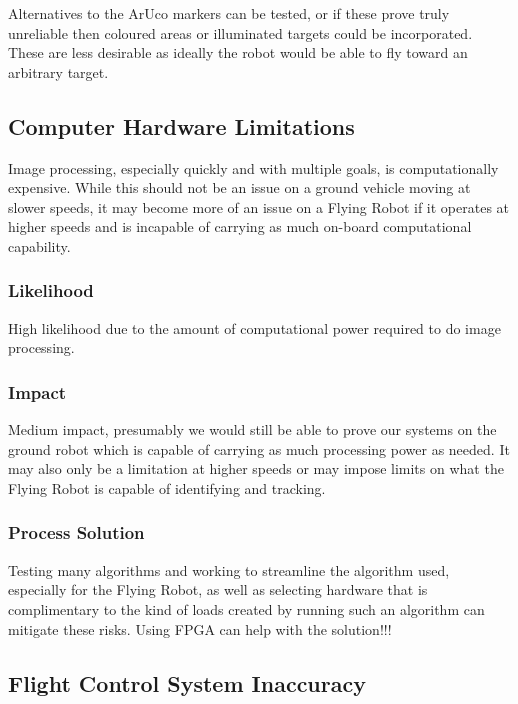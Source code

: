 \documentclass{article}
\begin{document}
		Alternatives to the ArUco markers can be tested, or if these prove truly unreliable then coloured areas or illuminated targets could be incorporated. These are less desirable as ideally the robot would be able to fly toward an arbitrary target.
		
	\subsection{Computer Hardware Limitations}
	
	Image processing, especially quickly and with multiple goals, is computationally expensive. While this should not be an issue on a ground vehicle moving at slower speeds, it may become more of an issue on a Flying Robot if it operates at higher speeds and is incapable of carrying as much on-board computational capability.
	
		\subsubsection{Likelihood}

		High likelihood due to the amount of computational power required to do image processing. 
		
		\subsubsection{Impact}
		
		Medium impact, presumably we would still be able to prove our systems on the ground robot which is capable of carrying as much processing power as needed. It may also only be a limitation at higher speeds or may impose limits on what the Flying Robot is capable of identifying and tracking. 
		
		\subsubsection{Process Solution}
		
		Testing many algorithms and working to streamline the algorithm used, especially for the Flying Robot, as well as selecting hardware that is complimentary to the kind of loads created by running such an algorithm can mitigate these risks. Using FPGA can help with the solution!!!
	
	\subsection{Flight Control System Inaccuracy}
	
\end{document}
